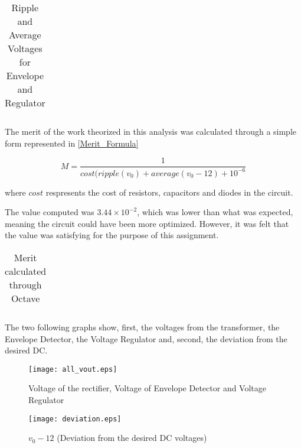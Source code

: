 \begin{table}[H]
    \centering
    \begin{tabular}{|c|c|}
    \hline
        
    \end{tabular}
    \caption{Ripple and Average Voltages for Envelope and Regulator}
    \label{table4a}
\end{table}

\par The merit of the work theorized in this analysis was calculated through a simple form represented in \ref{Merit_Formula}

\begin{equation}
	M = \frac{1}{cost(ripple(v_0)+average(v_0-12)+10^{-6}}
	\label{Merit_Formula}
\end{equation}

where $cost$ respresents the cost of resistors, capacitors and diodes in the circuit.

The value computed was $3.44\times 10^{-2}$, which was lower than what was expected, meaning the circuit could have been more optimized. However, it was felt that the value was satisfying for the purpose of this assignment.

\begin{table}[H]
    \centering
    \begin{tabular}{|c|c|}
    \hline
        
    \end{tabular}
    \caption{Merit calculated through Octave}
    \label{table4a}
\end{table}



\par The two following graphs show, first, the voltages from the transformer, the Envelope
Detector, the Voltage Regulator and, second, the deviation from the desired DC.


\begin{figure}[H]
	\texttt{[image: all\_vout.eps]}
	\centering
	\caption{Voltage of the rectifier, Voltage of Envelope Detector and Voltage Regulator}
	\label{pha}
\end{figure}

\begin{figure}[H]
	\texttt{[image: deviation.eps]}
	\centering
	\caption{$v_0-12$ (Deviation from the desired DC voltages)}
	\label{pha}
\end{figure}



